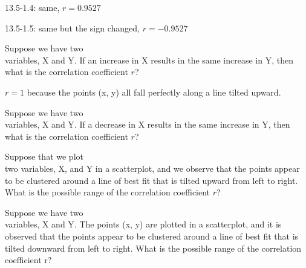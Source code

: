 \documentclass[11pt]{book}\usepackage[]{graphicx}\usepackage[]{color}
\begin{document}
\begin{exercises}
\begin{solution}
13.5-1.4: same, $r = 0.9527 $ 

13.5-1.5: same but the sign changed, $r = -0.9527 $ 

\end{solution}

\begin{exercise} %

Suppose we have two \\ variables, X and Y. If an increase in X results in the same increase in Y, then what is the correlation coefficient $r$?
\end{exercise}
\begin{solution} %

$r = 1$ because the points (x, y) all fall perfectly along a line tilted upward.

\end{solution}

\begin{exercise} %

Suppose we have two \\ variables, X and Y. If a decrease in X results in the same increase in Y, then what is the correlation coefficient $r$?
\end{exercise}
\begin{solution} %

\end{solution}

\begin{exercise} %

Suppose that we plot \\ two variables, X, and Y in a scatterplot, and we observe that the points appear to be clustered around a line of best fit that is tilted upward from left to right.  What is the possible range of the correlation coefficient $r$?
\end{exercise}
\begin{solution} %


\end{solution}

\begin{exercise} %

Suppose we have two \\ variables, X and Y. The points (x, y) are plotted in a scatterplot, and it is observed that the points appear to be clustered around a line of best fit that is tilted downward from left to right. What is the possible range of the correlation coefficient r?

\end{exercise}
\begin{solution} %


\end{solution}
\end{exercises}
\end{document}
